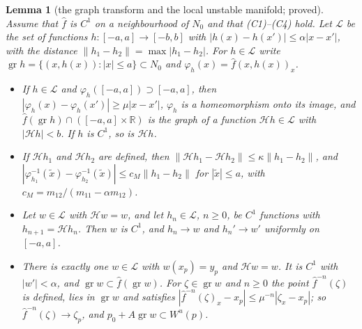 \documentclass[11pt]{article}
\newtheorem{lemma}{Lemma}
\theoremstyle{definition}
\newcommand{\R}{\mathbb{R}}
\begin{document}
\begin{lemma}[the graph transform and the local unstable manifold; proved]\label{lem:graph}
Assume that $\hat f$ is $C^1$ on a neighbourhood of $N_0$ and that (C1)--(C4) hold. Let $\mathcal L$ be the set of functions $h: [-a, a] \to [-b, b]$ with $|h(x) - h(x')| \le \alpha|x - x'|$, with the distance $\|h_1 - h_2\| = \max|h_1 - h_2|$. For $h \in \mathcal L$ write $\operatorname{gr}h = \{(x, h(x)) : |x| \le a\} \subset N_0$ and $\varphi_h(x) = \hat f(x, h(x))_x$.
\begin{itemize}
\item[(a)] If $h \in \mathcal L$ and $\varphi_h([-a, a]) \supset [-a, a]$, then $|\varphi_h(x) - \varphi_h(x')| \ge \mu|x - x'|$, $\varphi_h$ is a homeomorphism onto its image, and $\hat f(\operatorname{gr}h) \cap ([-a, a] \times \R)$ is the graph of a function $\mathcal H h \in \mathcal L$ with $|\mathcal H h| < b$. If $h$ is $C^1$, so is $\mathcal H h$.
\item[(b)] If $\mathcal H h_1$ and $\mathcal H h_2$ are defined, then $\|\mathcal H h_1 - \mathcal H h_2\| \le \kappa\|h_1 - h_2\|$, and $|\varphi_{h_1}^{-1}(\tilde x) - \varphi_{h_2}^{-1}(\tilde x)| \le c_M\|h_1 - h_2\|$ for $|\tilde x| \le a$, with $c_M = m_{12}/(m_{11} - \alpha m_{12})$.
\item[(c)] Let $w \in \mathcal L$ with $\mathcal H w = w$, and let $h_n \in \mathcal L$, $n \ge 0$, be $C^1$ functions with $h_{n+1} = \mathcal H h_n$. Then $w$ is $C^1$, and $h_n \to w$ and $h_n' \to w'$ uniformly on $[-a, a]$.
\item[(d)] There is exactly one $w \in \mathcal L$ with $w(x_p) = y_p$ and $\mathcal H w = w$. It is $C^1$ with $|w'| < \alpha$, and $\operatorname{gr}w \subset \hat f(\operatorname{gr}w)$. For $\zeta \in \operatorname{gr}w$ and $n \ge 0$ the point $\hat f^{-n}(\zeta)$ is defined, lies in $\operatorname{gr}w$ and satisfies $|\hat f^{-n}(\zeta)_x - x_p| \le \mu^{-n}|\zeta_x - x_p|$; so $\hat f^{-n}(\zeta) \to \zeta_p$, and $p_0 + A\operatorname{gr}w \subset W^u(p)$.
\end{itemize}
\end{lemma}
\end{document}
